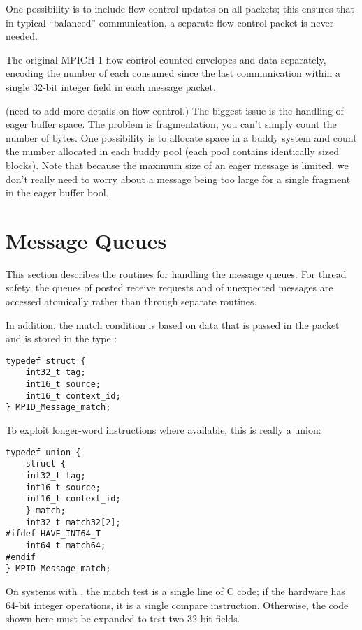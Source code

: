 \documentclass{article}
\begin{document}
One possibility is to include flow control updates on all packets; this
ensures that in typical ``balanced'' communication, a separate flow control
packet is never needed.  

The original MPICH-1 flow control counted envelopes and data
separately, encoding the number of each consumed since the last
communication within a single 32-bit integer field in each message
packet.  

(need to add more details on flow control.)  
The biggest issue is the
handling of eager buffer space.  The problem is fragmentation; you
can't simply count the number of bytes.  One possibility is to
allocate space in a buddy system and count the number allocated in
each buddy pool (each pool contains identically sized blocks).  Note
that because the maximum size of an eager message is limited, we don't
really need to worry about a message being too large for a single
fragment in the eager buffer bool.

\section{Message Queues}
\label{sec:msg-queues}
This section describes the routines for handling the message queues.  For
thread safety, the queues of posted receive requests and of unexpected
messages are accessed atomically rather than through separate routines.

In addition, the match condition is based on data that is passed in the packet
and is stored in the type :
\begin{verbatim}
typedef struct {
    int32_t tag;
    int16_t source;
    int16_t context_id;
} MPID_Message_match;
\end{verbatim}
To exploit longer-word instructions where available, this is really a
union:
\begin{verbatim}
typedef union { 
    struct { 
    int32_t tag;
    int16_t source;
    int16_t context_id;
    } match;
    int32_t match32[2];
#ifdef HAVE_INT64_T
    int64_t match64;
#endif
} MPID_Message_match;
\end{verbatim}

On systems with , the match test is a single line of C code; if
the hardware has 64-bit integer operations, it is a single compare
instruction.  Otherwise, the code shown here must be expanded to test
two 32-bit fields.  
\end{document}
